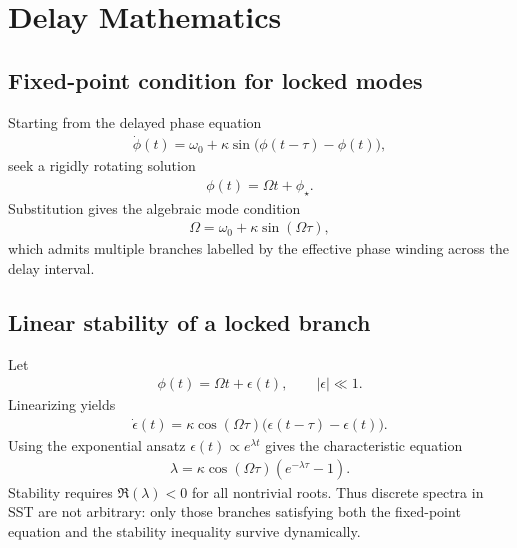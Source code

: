 \documentclass[11pt]{article}
\theoremstyle{definition}
\theoremstyle{plain}
\theoremstyle{remark}
\begin{document}
    \section{Delay Mathematics}
        \label{sec:appendix_delay}

        \subsection{Fixed-point condition for locked modes}
            Starting from the delayed phase equation
            \begin{align}
                \dot{\phi}(t) = \omega_0 + \kappa \sin\big(\phi(t-\tau)-\phi(t)\big),
            \end{align}
            seek a rigidly rotating solution
            \begin{align}
                \phi(t)=\Omega t + \phi_\star.
            \end{align}
            Substitution gives the algebraic mode condition
            \begin{align}
                \Omega = \omega_0 + \kappa \sin(\Omega\tau),
            \end{align}
            which admits multiple branches labelled by the effective phase winding across the delay interval.

        \subsection{Linear stability of a locked branch}
            Let
            \begin{align}
                \phi(t) = \Omega t + \epsilon(t),
                \qquad |\epsilon|\ll 1.
            \end{align}
            Linearizing yields
            \begin{align}
                \dot{\epsilon}(t)
                =
                \kappa \cos(\Omega\tau)
                \big(\epsilon(t-\tau)-\epsilon(t)\big).
            \end{align}
            Using the exponential ansatz $\epsilon(t)\propto e^{\lambda t}$ gives the characteristic equation
            \begin{align}
                \lambda
                =
                \kappa \cos(\Omega\tau)
                \left(e^{-\lambda\tau}-1\right).
            \end{align}
            Stability requires $\Re(\lambda)<0$ for all nontrivial roots. Thus discrete spectra in SST are not arbitrary: only those branches satisfying both the fixed-point equation and the stability inequality survive dynamically.
\end{document}

